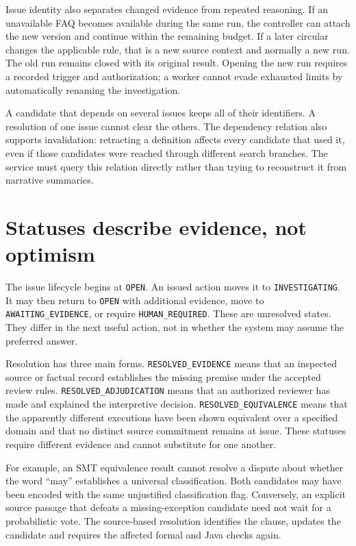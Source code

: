 \documentclass[12pt,a4paper,oneside,openany]{book}
\begin{document}
Issue identity also separates changed evidence from repeated reasoning. If an
unavailable FAQ becomes available during the same run, the controller can attach
the new version and continue within the remaining budget. If a later circular
changes the applicable rule, that is a new source context and normally a new run.
The old run remains closed with its original result. Opening the new run requires
a recorded trigger and authorization; a worker cannot evade exhausted limits by
automatically renaming the investigation.

A candidate that depends on several issues keeps all of their identifiers. A
resolution of one issue cannot clear the others. The dependency relation also
supports invalidation: retracting a definition affects every candidate that used
it, even if those candidates were reached through different search branches.
The service must query this relation directly rather than trying to reconstruct
it from narrative summaries.

\section{Statuses describe evidence, not optimism}
\label{merge:M06:07}


The issue lifecycle begins at \texttt{OPEN}. An issued action moves it to
\texttt{INVESTIGATING}. It may then return to \texttt{OPEN} with additional evidence,
move to \texttt{AWAITING\_EVIDENCE}, or require \texttt{HUMAN\_REQUIRED}. These are
unresolved states. They differ in the next useful action, not in whether the
system may assume the preferred answer.

Resolution has three main forms. \texttt{RESOLVED\_EVIDENCE} means that an inspected
source or factual record establishes the missing premise under the accepted
review rules. \texttt{RESOLVED\_ADJUDICATION} means that an authorized reviewer has
made and explained the interpretive decision. \texttt{RESOLVED\_EQUIVALENCE} means
that the apparently different executions have been shown equivalent over a
specified domain and that no distinct source commitment remains at issue.
These statuses require different evidence and cannot substitute for one another.

For example, an SMT equivalence result cannot resolve a dispute about whether the
word ``may'' establishes a universal classification. Both candidates may have
been encoded with the same unjustified classification flag. Conversely, an
explicit source passage that defeats a missing-exception candidate need not wait
for a probabilistic vote. The source-based resolution identifies the clause,
updates the candidate and requires the affected formal and Java checks again.
\end{document}

